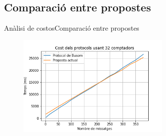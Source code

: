 \documentclass{beamer}
\begin{document}
\subsection{Comparació entre propostes}
\begin{frame}{Anàlisi de costos}{Comparació entre propostes}
	\begin{figure}
		\includegraphics[width=20em]{images/32compt.png}
	\end{figure}
\end{frame}
\end{document}
